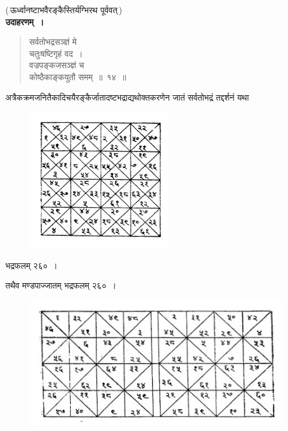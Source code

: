 \documentclass[11pt, openany]{book}
\begin{document}
(\,ऊर्ध्वानष्टाभवैरङ्कैस्तिर्यग्भिरथ पूर्ववत्\,)\\

\textbf{उदाहरणम्~।}

\begin{quote}
{\ex सर्वतोभद्रसञ्ज्ञं मे\\
चतुःषष्टिगृहं वद~।\\
वज्रपङ्कजसञ्ज्ञं च\\
कोष्ठैकाङ्कयुतौ समम्~॥~१४~॥	}
\end{quote}

अत्रैकक्रमजनितैकादिचयैरङ्कैर्जातादष्टभद्राद्यथोक्तकरणेन \;जातं \;सर्वतोभद्रं \;तद्दर्शनं यथा

\newpage

\begin{figure}[h!]
    \centering
    \includegraphics[scale=0.65]{graphics/416_1.jpg}
    
\end{figure}
\vspace{-8mm}

\begin{center}
भद्रफलम् २६०~।\\
\vspace{6mm}

तथैव मण्डपाज्जातम् भद्रफलम् २६०~।
\end{center}
\vspace{-4mm}

\begin{figure}[h!]
    \centering
    \includegraphics[scale=0.5]{graphics/416_2.jpg}
    
\end{figure}
\end{document}
